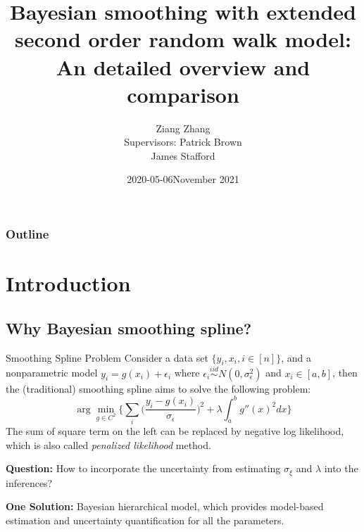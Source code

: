 \documentclass{beamer} %
\title{\textbf{Bayesian smoothing with extended second order random walk model: An detailed overview and comparison}}
\author{Ziang Zhang\\[5mm]{\small Supervisors: Patrick Brown \\ \hspace{18mm} James Stafford}}
\institute{Department of Statistics, University of Toronto}
\date{2020-05-06}
\date{November 2021}
\begin{document}
\begin{frame}
\titlepage
\end{frame}

\begin{frame}
\frametitle{Outline}
\tableofcontents
\end{frame}

\section{Introduction}
\subsection{Why Bayesian smoothing spline?}
\begin{frame}
\begin{block}{Smoothing Spline Problem}
Consider a data set $\{y_i,x_i, i\in [n]\}$, and a nonparametric model $y_i = g(x_i) + \epsilon_i$ where $\epsilon_i \overset{iid}\sim N(0,\sigma_\epsilon^2)$ and $x_i \in [a,b]$, then the (traditional) smoothing spline aims to solve the following problem:
\pause
\begin{equation}\label{equ:ss}
\arg\min_{g\in C^2} \bigg\{ \sum_i \bigg(\frac{y_i-g(x_i)}{\sigma_\epsilon}\bigg)^2 + \lambda  \int_a^b g''(x)^2 dx \bigg\}
\end{equation}
\pause
The sum of square term on the left can be replaced by negative log likelihood, which is also called \textit{penalized likelihood} method.
\end{block}

\pause

\textbf{Question:} How to incorporate the uncertainty from estimating $\sigma_\xi$ and $\lambda$ into  the inferences?

\pause

\textbf{One Solution:} Bayesian hierarchical model, which provides model-based estimation and uncertainty quantification for all the parameters.

\end{frame}
\end{document}
